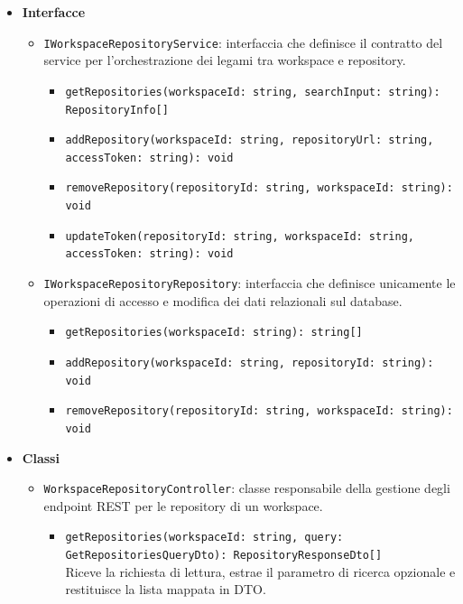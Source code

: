 \documentclass[a4paper, 11pt]{article}
\newcounter{subsubsubsection}[subsubsection]
\newcounter{subsubsubsubsection}[subsubsubsection]
\begin{document}
\begin{itemize}
  \item \textbf{Interfacce}
    \begin{itemize}
      \item \texttt{IWorkspaceRepositoryService}: interfaccia che definisce il contratto del service per l'orchestrazione dei legami tra workspace e repository.
        \begin{itemize}
          \item \texttt{getRepositories(workspaceId: string, searchInput: string): RepositoryInfo[]} 
          
          \item \texttt{addRepository(workspaceId: string, repositoryUrl: string, accessToken: string): void} 

          \item \texttt{removeRepository(repositoryId: string, workspaceId: string): void} 

          \item \texttt{updateToken(repositoryId: string, workspaceId: string, accessToken: string): void} 
        \end{itemize}

      \item \texttt{IWorkspaceRepositoryRepository}: interfaccia che definisce unicamente le operazioni di accesso e modifica dei dati relazionali sul database.
        \begin{itemize}
          \item \texttt{getRepositories(workspaceId: string): string[]} 

          \item \texttt{addRepository(workspaceId: string, repositoryId: string): void} 

          \item \texttt{removeRepository(repositoryId: string, workspaceId: string): void} 
        \end{itemize}
    \end{itemize}
    
  \item \textbf{Classi}
    \begin{itemize}
      \item \texttt{WorkspaceRepositoryController}: classe responsabile della gestione degli endpoint REST per le repository di un workspace.
        \begin{itemize}
          \item \texttt{getRepositories(workspaceId: string, query: GetRepositoriesQueryDto): RepositoryResponseDto[]} \\
          Riceve la richiesta di lettura, estrae il parametro di ricerca opzionale e restituisce la lista mappata in DTO.


\end{itemize}
\end{itemize}
\end{itemize}
\end{document}
